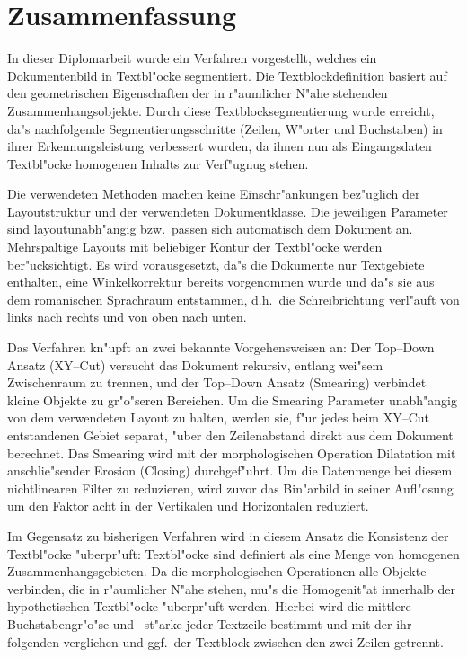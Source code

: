 \chapter{Zusammenfassung}

In dieser Diplomarbeit wurde ein Verfahren vorgestellt, welches ein Dokumentenbild
in Textbl"ocke segmentiert. Die Textblockdefinition basiert
auf den geometrischen Eigenschaften der in r"aumlicher N"ahe stehenden Zusammenhangsobjekte.
Durch diese Textblocksegmentierung wurde erreicht, da"s nachfolgende
Segmentierungsschritte (Zeilen, W"orter und Buchstaben) in ihrer Erkennungsleistung
verbessert wurden, da ihnen nun als Eingangsdaten Textbl"ocke homogenen Inhalts zur Verf"ugnug
stehen.

Die verwendeten Methoden machen keine Einschr"ankungen bez"uglich der Layoutstruktur
und der verwendeten
Dokumentklasse. Die jeweiligen Parameter sind layoutunabh"angig bzw.\ passen sich 
automatisch dem Dokument an. Mehrspaltige Layouts mit beliebiger Kontur der Textbl"ocke
werden ber"ucksichtigt. Es wird vorausgesetzt, da"s die Dokumente nur 
Textgebiete enthalten, eine Winkelkorrektur bereits vorgenommen wurde und da"s sie aus dem
romanischen Sprachraum entstammen, d.h.\ die Schreibrichtung verl"auft von links nach rechts und von
oben nach unten.

Das Verfahren kn"upft an zwei bekannte Vorgehensweisen an: 
Der Top--Down Ansatz (XY--Cut) versucht das Dokument rekursiv, entlang wei"sem 
Zwischenraum zu trennen, und der Top--Down Ansatz (Smearing) 
verbindet kleine Objekte zu gr"o"seren Bereichen. Um die Smearing Parameter unabh"angig von dem
verwendeten Layout zu halten, werden sie, f"ur jedes beim XY--Cut entstandenen Gebiet separat,
"uber den Zeilenabstand direkt aus dem Dokument berechnet. Das Smearing wird mit der
morphologischen Operation Dilatation mit anschlie"sender Erosion (Closing) durchgef"uhrt. Um
die Datenmenge bei diesem nichtlinearen Filter zu reduzieren, wird zuvor das Bin"arbild in
seiner Aufl"osung um den Faktor acht in der Vertikalen und Horizontalen reduziert.

Im Gegensatz zu bisherigen Verfahren wird in diesem Ansatz die Konsistenz der Textbl"ocke "uberpr"uft: 
Textbl"ocke sind definiert als eine Menge von homogenen Zusammenhangsgebieten. Da die
morphologischen Operationen alle Objekte verbinden, die in r"aumlicher N"ahe stehen, mu"s die
Homogenit"at innerhalb der hypothetischen Textbl"ocke "uberpr"uft werden. Hierbei wird
die mittlere Buchstabengr"o"se und --st"arke jeder Textzeile bestimmt und mit der ihr folgenden
verglichen und ggf.\ der Textblock zwischen den zwei Zeilen getrennt.

